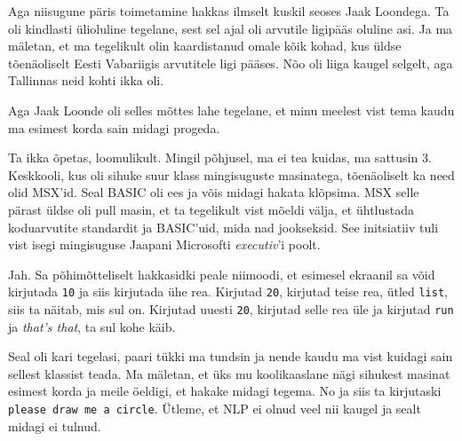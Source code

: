 Aga niisugune päris toimetamine hakkas ilmselt kuskil seoses Jaak 
Loondega. Ta oli kindlasti ülioluline tegelane, sest 
sel ajal oli arvutile ligipääs oluline asi. Ja ma mäletan, et ma tegelikult 
olin kaardistanud omale kõik kohad, kus üldse  tõenäoliselt Eesti Vabariigis 
arvutitele ligi pääses. Nõo oli liiga kaugel selgelt, aga Tallinnas neid kohti 
ikka oli. 

Aga Jaak Loonde oli selles mõttes lahe tegelane, et 
minu meelest vist tema kaudu ma esimest korda sain midagi progeda. 


Ta ikka õpetas, loomulikult. Mingil põhjusel, ma ei tea kuidas, ma sattusin  3. 
Keskkooli, kus oli sihuke suur klass 
mingisuguste masinatega, tõenäoliselt ka need olid MSX'id. Seal BASIC oli ees ja võis midagi hakata klõpsima. 
MSX selle pärast  üldse oli pull masin, et  ta tegelikult vist mõeldi välja, et 
ühtlustada koduarvutite standardit ja BASIC'uid, mida nad jookseksid.  See 
initsiatiiv tuli vist isegi  mingisuguse Jaapani Microsofti \emph{executiv}'i 
poolt.


Jah. Sa põhimõtteliselt hakkasidki peale niimoodi, et esimesel ekraanil sa võid 
 kirjutada \verb|10| ja siis kirjutada ühe rea. Kirjutad \verb|20|, kirjutad 
teise rea, ütled \verb|list|, siis ta  näitab, mis sul on. Kirjutad uuesti 
\verb|20|, kirjutad selle rea üle ja kirjutad \verb|run| ja \emph{that's that}, 
ta sul kohe käib. 

Seal oli kari tegelasi, paari tükki ma tundsin ja nende kaudu ma vist kuidagi 
sain sellest klassist teada. Ma mäletan, et üks mu koolikaaslane nägi sihukest 
masinat esimest korda ja meile öeldigi, et hakake midagi tegema. No ja siis ta 
kirjutaski \verb|please draw me a circle|. Ütleme, et 
NLP ei olnud veel nii kaugel 
ja sealt midagi ei tulnud.


